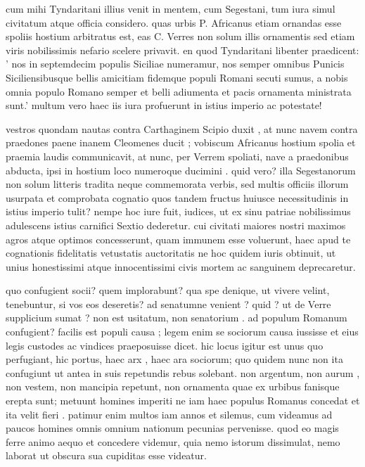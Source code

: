  cum mihi Tyndaritani illius venit in mentem, cum Segestani, tum iura simul civitatum atque officia considero. quas urbis P. Africanus etiam ornandas esse spoliis hostium arbitratus est, eas C. Verres non solum illis ornamentis sed etiam viris nobilissimis nefario scelere privavit. en quod Tyndaritani libenter praedicent: ' nos in septemdecim populis Siciliae numeramur, nos semper omnibus Punicis Siciliensibusque bellis amicitiam fidemque populi Romani secuti sumus, a nobis omnia populo Romano semper et belli adiumenta et pacis ornamenta ministrata sunt.' multum vero haec iis iura profuerunt in istius imperio ac potestate!

 vestros quondam nautas contra Carthaginem Scipio duxit , at nunc navem contra praedones paene inanem Cleomenes ducit ; vobiscum Africanus hostium spolia et praemia laudis communicavit, at nunc, per Verrem spoliati, nave a praedonibus abducta, ipsi in hostium loco numeroque ducimini . quid vero? illa Segestanorum non solum litteris tradita neque commemorata verbis, sed multis officiis illorum usurpata et comprobata cognatio quos tandem fructus huiusce necessitudinis in istius imperio tulit? nempe hoc iure fuit, iudices, ut ex sinu patriae nobilissimus adulescens istius carnifici Sextio dederetur. cui civitati maiores nostri maximos agros atque optimos concesserunt, quam immunem esse voluerunt, haec apud te cognationis fidelitatis vetustatis auctoritatis ne hoc quidem iuris obtinuit, ut unius honestissimi atque innocentissimi civis mortem ac sanguinem deprecaretur.

 quo confugient socii? quem implorabunt? qua spe denique, ut vivere velint, tenebuntur, si vos eos deseretis? ad senatumne venient ? quid ? ut de Verre supplicium sumat ? non est usitatum, non senatorium . ad populum Romanum confugient? facilis est populi causa ; legem enim se sociorum causa iussisse et eius legis custodes ac vindices praeposuisse dicet. hic locus igitur est unus quo perfugiant, hic portus, haec arx , haec ara sociorum; quo quidem nunc non ita confugiunt ut antea in suis repetundis rebus solebant. non argentum, non aurum , non vestem, non mancipia repetunt, non ornamenta quae ex urbibus fanisque erepta sunt; metuunt homines imperiti ne iam haec populus Romanus concedat et ita velit fieri . patimur enim multos iam annos et silemus, cum videamus ad paucos homines omnis omnium nationum pecunias pervenisse. quod eo magis ferre animo aequo et concedere videmur, quia nemo istorum dissimulat, nemo laborat ut obscura sua cupiditas esse videatur.

